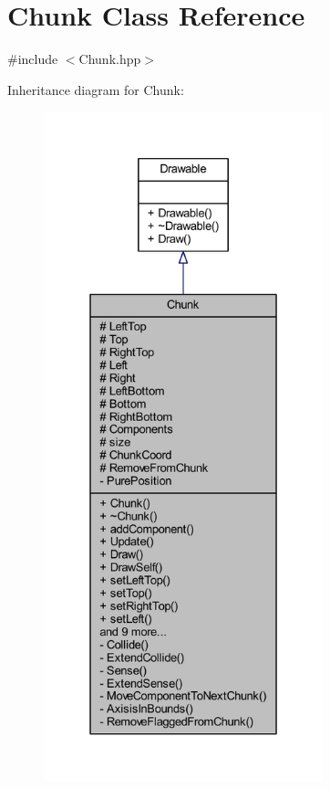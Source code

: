 \hypertarget{class_chunk}{\section{Chunk Class Reference}
\label{class_chunk}
}


{\ttfamily \#include $<$Chunk.\-hpp$>$}



Inheritance diagram for Chunk\-:
\nopagebreak
\begin{figure}[H]
\begin{center}
\leavevmode
\includegraphics[height=550pt]{class_chunk__inherit__graph}
\end{center}
\end{figure}


